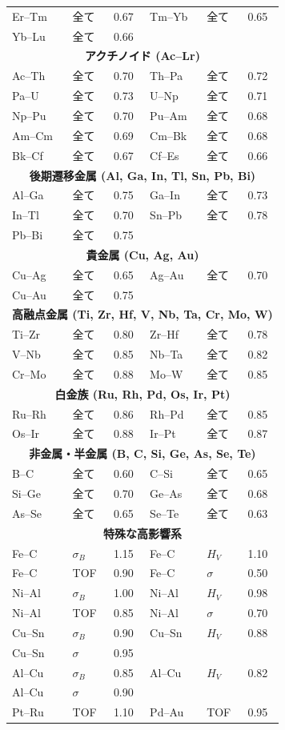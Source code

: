 \documentclass[11pt,a4paper]{article}
\theoremstyle{remark}
\begin{document}
\begin{longtable}{p{1.5cm}p{1.5cm}p{1.2cm}p{1.2cm}p{1.2cm}p{1.2cm}}
		Er–Tm & 全て & 0.67 & Tm–Yb & 全て & 0.65 \\
		Yb–Lu & 全て & 0.66 & & & \\
		\multicolumn{6}{c}{\textbf{アクチノイド (Ac–Lr)}} \\
		Ac–Th & 全て & 0.70 & Th–Pa & 全て & 0.72 \\
		Pa–U  & 全て & 0.73 & U–Np & 全て & 0.71 \\
		Np–Pu & 全て & 0.70 & Pu–Am & 全て & 0.68 \\
		Am–Cm & 全て & 0.69 & Cm–Bk & 全て & 0.68 \\
		Bk–Cf & 全て & 0.67 & Cf–Es & 全て & 0.66 \\
		\multicolumn{6}{c}{\textbf{後期遷移金属 (Al, Ga, In, Tl, Sn, Pb, Bi)}} \\
		Al–Ga & 全て & 0.75 & Ga–In & 全て & 0.73 \\
		In–Tl & 全て & 0.70 & Sn–Pb & 全て & 0.78 \\
		Pb–Bi & 全て & 0.75 & & & \\
		\multicolumn{6}{c}{\textbf{貴金属 (Cu, Ag, Au)}} \\
		Cu–Ag & 全て & 0.65 & Ag–Au & 全て & 0.70 \\
		Cu–Au & 全て & 0.75 & & & \\
		\multicolumn{6}{c}{\textbf{高融点金属 (Ti, Zr, Hf, V, Nb, Ta, Cr, Mo, W)}} \\
		Ti–Zr & 全て & 0.80 & Zr–Hf & 全て & 0.78 \\
		V–Nb & 全て & 0.85 & Nb–Ta & 全て & 0.82 \\
		Cr–Mo & 全て & 0.88 & Mo–W & 全て & 0.85 \\
		\multicolumn{6}{c}{\textbf{白金族 (Ru, Rh, Pd, Os, Ir, Pt)}} \\
		Ru–Rh & 全て & 0.86 & Rh–Pd & 全て & 0.85 \\
		Os–Ir & 全て & 0.88 & Ir–Pt & 全て & 0.87 \\
		\multicolumn{6}{c}{\textbf{非金属・半金属 (B, C, Si, Ge, As, Se, Te)}} \\
		B–C  & 全て & 0.60 & C–Si  & 全て & 0.65 \\
		Si–Ge & 全て & 0.70 & Ge–As & 全て & 0.68 \\
		As–Se & 全て & 0.65 & Se–Te & 全て & 0.63 \\
		\multicolumn{6}{c}{\textbf{特殊な高影響系}} \\
		Fe–C  & \(\sigma_B\) & 1.15 & Fe–C  & \(H_V\) & 1.10 \\
		Fe–C  & TOF & 0.90 & Fe–C  & \(\sigma\) & 0.50 \\
		Ni–Al & \(\sigma_B\) & 1.00 & Ni–Al & \(H_V\) & 0.98 \\
		Ni–Al & TOF & 0.85 & Ni–Al & \(\sigma\) & 0.70 \\
		Cu–Sn & \(\sigma_B\) & 0.90 & Cu–Sn & \(H_V\) & 0.88 \\
		Cu–Sn & \(\sigma\) & 0.95 & & & \\
		Al–Cu & \(\sigma_B\) & 0.85 & Al–Cu & \(H_V\) & 0.82 \\
		Al–Cu & \(\sigma\) & 0.90 & & & \\
		Pt–Ru & TOF & 1.10 & Pd–Au & TOF & 0.95 \\
		\bottomrule
	\end{longtable}
\end{document}
